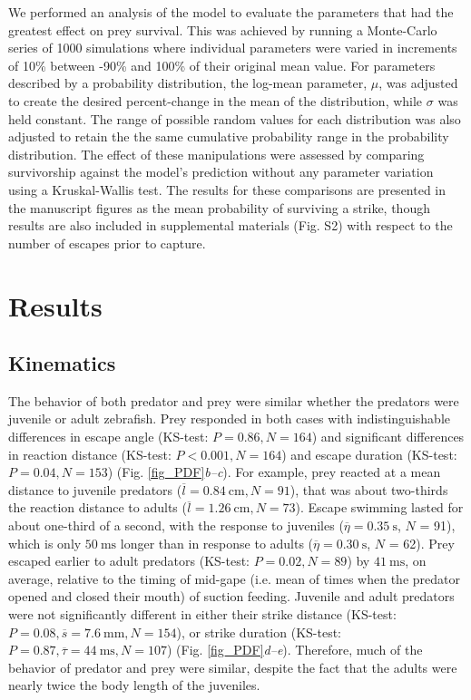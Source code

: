 \documentclass[]{rsos}%
\begin{document}
We performed an analysis of the model to evaluate the parameters that had the greatest effect on prey survival. 
This was achieved by running a Monte-Carlo series of 1000 simulations where individual parameters were varied in increments of 10\% between -90\% and 100\% of their original mean value.
For parameters described by a probability distribution, the log-mean parameter, $\mu$, was adjusted to create the desired percent-change in the mean of the distribution, while $\sigma$ was held constant.
The range of possible random values for each distribution was also adjusted to retain the the same cumulative probability range in the probability distribution.
The effect of these manipulations were assessed by comparing survivorship against the model's prediction without any parameter variation using a Kruskal-Wallis test. 
The results for these comparisons are presented in the manuscript figures as the mean probability of surviving a strike, though results are also included in supplemental materials (Fig. S2) with respect to the number of escapes prior to capture.


\section{Results} %

\subsection{Kinematics} %
The behavior of both predator and prey were similar whether the predators were juvenile or adult zebrafish.
Prey responded in both cases with indistinguishable differences in escape angle (KS-test: $P = 0.86, N = 164$) and significant differences in reaction distance (KS-test: $P < 0.001, N = 164$) and escape duration (KS-test: $P = 0.04, N = 153$) (Fig. \ref{fig_PDF}\textit{b--c}). 
For example, prey reacted at a mean distance to juvenile predators ($\overline{l} = \SI{0.84}{\cm}, N = 91$), that was about two-thirds the reaction distance to adults ($\overline{l} = \SI{1.26}{\cm}, N = 73$).
Escape swimming lasted for about one-third of a second, with the response to juveniles ($\overline{\eta} = \SI{0.35}{\s}$, $N$ = 91), which is only $\SI{50}{\ms}$ longer than in response to adults ($\overline{\eta} = \SI{0.30}{\s}$, $N$ = 62).
Prey escaped earlier to adult predators (KS-test: $P = 0.02, N = 89$) by $\SI{41}{\ms}$, on average, relative to the timing of mid-gape (i.e. mean of times when the predator opened and closed their mouth) of suction feeding.
Juvenile and adult predators were not significantly different in either their strike distance (KS-test: $P = 0.08, \overline{s} = \SI{7.6}{\mm}, N = 154$), or strike duration (KS-test: $P = 0.87, \overline{\tau} = \SI{44}{\ms}, N = 107$) (Fig. \ref{fig_PDF}\textit{d--e}).
Therefore, much of the behavior of predator and prey were similar, despite the fact that the adults were nearly twice the body length of the juveniles.
\end{document}
